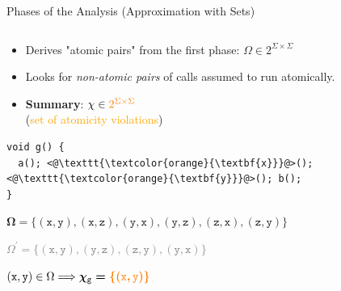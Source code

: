 \documentclass[10pt, xcolor=pdflatex, hyperref={unicode}, aspectratio=169]{beamer}
\begin{document}
\begin{frame}[fragile]{Phases of the Analysis (Approximation with Sets)}
\begin{columns}
\begin{column}[T]{.45 \linewidth}
            \begin{itemize}
                \item Derives "\alert{atomic pairs}" from the first phase: $ \Omega \in 2^{\Sigma \times \Sigma} $

                \item Looks for \emph{non-atomic pairs} of calls assumed to \alert{run atomically}.

                \item \textbf{Summary}: $ \chi \in \textcolor{orange}{2^{\Sigma \times \Sigma}} $ \\
                    (\textcolor{orange}{set of atomicity violations})
            \end{itemize}

            \medskip

\begin{lstlisting}
void g() {
  a(); <@\texttt{\textcolor{orange}{\textbf{x}}}@>(); <@\texttt{\textcolor{orange}{\textbf{y}}}@>(); b();
}
\end{lstlisting}

            \medskip
            \centering
            \footnotesize

            $ \boldsymbol{\Omega = \{(\mathtt{x, y}), (\mathtt{x, z}), (\mathtt{y, x}), (\mathtt{y, z}), (\mathtt{z, x}), (\mathtt{z, y})\}} $

            \smallskip

            \textcolor{gray}{$ \Omega^\prime = \{(\mathtt{x, y}), (\mathtt{y, z}), (\mathtt{z, y}), (\mathtt{y, x})\} $}

            \smallskip

            $ (\mathtt{x, y}) \in \Omega \Longrightarrow \boldsymbol{\chi_\mathtt{g} = \textcolor{orange}{\{(\mathtt{x, y})\}}} $
        \end{column}
    \end{columns}
\end{frame}


\end{document}
